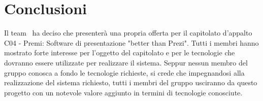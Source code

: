 \section{Conclusioni}
Il team \gruppo\ ha deciso che presenterà una propria offerta per il capitolato d'appalto C04 - Premi: Software di presentazione "better than Prezi".
Tutti i membri hanno mostrato forte interesse per l'oggetto del capitolato e per le
tecnologie che dovranno essere utilizzate per realizzare il sistema. Seppur nessun
membro del gruppo conosca a fondo le tecnologie richieste, si crede che impegnandosi
alla realizzazione del sistema richiesto, tutti i membri del gruppo usciranno da questo progetto con un notevole valore aggiunto in termini di tecnologie conosciute.
